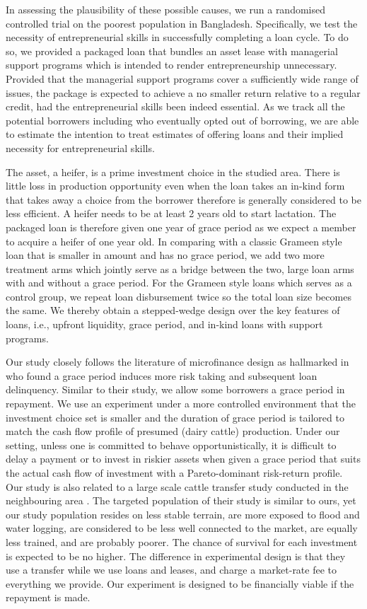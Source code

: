	In assessing the plausibility of these possible causes, we run a randomised controlled trial on the poorest population in Bangladesh. Specifically, we test the necessity of entrepreneurial skills in successfully completing a loan cycle. To do so, we provided a packaged loan that bundles an asset lease with managerial support programs which is intended to render entrepreneurship unnecessary. Provided that the managerial support programs cover a sufficiently wide range of issues, the package is expected to achieve a no smaller return relative to a regular credit, had the entrepreneurial skills been indeed essential. As we track all the potential borrowers including who eventually opted out of borrowing, we are able to estimate the intention to treat estimates of offering loans and their implied necessity for entrepreneurial skills. 
	
	The asset, a heifer, is a prime investment choice in the studied area. There is little loss in production opportunity even when the loan takes an in-kind form that takes away a choice from the borrower therefore is generally considered to be less efficient. A heifer needs to be at least 2 years old to start lactation. The packaged loan is therefore given one year of grace period as we expect a member to acquire a heifer of one year old. In comparing with a classic Grameen style loan that is smaller in amount and has no grace period, we add two more treatment arms which jointly serve as a bridge between the two, large loan arms with and without a grace period. For the Grameen style loans which serves as a control group, we repeat loan disbursement twice so the total loan size becomes the same. We thereby obtain a stepped-wedge design over the key features of loans, i.e., upfront liquidity, grace period, and in-kind loans with support programs.

	Our study closely follows the literature of microfinance design as hallmarked in \citet{Field2013} who found a grace period induces more risk taking and subsequent loan delinquency. Similar to their study, we allow some borrowers a grace period in repayment. We use an experiment under a more controlled environment that the investment choice set is smaller and the duration of grace period is tailored to match the cash flow profile of presumed (dairy cattle) production. Under our setting, unless one is committed to behave opportunistically, it is difficult to delay a payment or to invest in riskier assets when given a grace period that suits the actual cash flow of investment with a Pareto-dominant risk-return profile. Our study is also related to a large scale cattle transfer study conducted in the neighbouring area \citep{BandieraBRAC2017}. The targeted population of their study is similar to ours, yet our study population resides on less stable terrain, are more exposed to flood and water logging, are considered to be less well connected to the market, are equally less trained, and are probably poorer. The chance of survival for each investment is expected to be no higher. The difference in experimental design is that they use a transfer while we use loans and leases, and charge a market-rate fee to everything we provide. Our experiment is designed to be financially viable if the repayment is made. 

